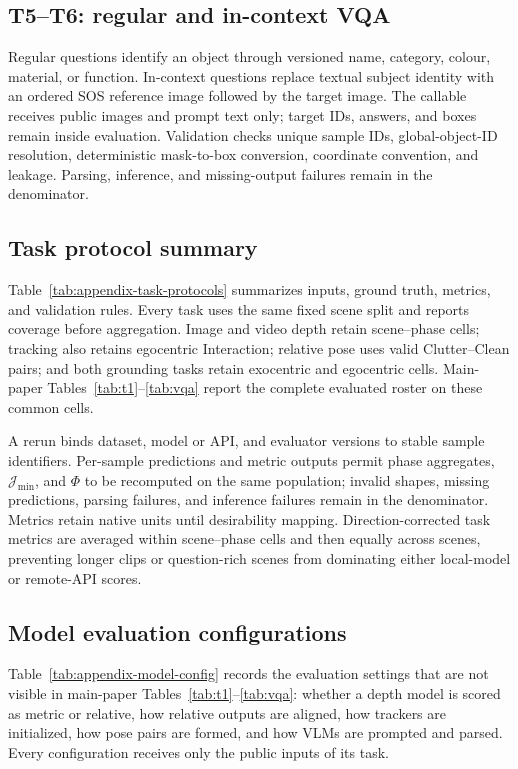 \subsection{T5--T6: regular and in-context VQA}

Regular questions identify an object through versioned name, category, colour, material, or function. In-context questions replace textual subject identity with an ordered SOS reference image followed by the target image. The callable receives public images and prompt text only; target IDs, answers, and boxes remain inside evaluation. Validation checks unique sample IDs, global-object-ID resolution, deterministic mask-to-box conversion, coordinate convention, and leakage. Parsing, inference, and missing-output failures remain in the denominator.

\subsection{Task protocol summary}

Table~\ref{tab:appendix-task-protocols} summarizes inputs, ground truth, metrics, and validation rules. Every task uses the same fixed scene split and reports coverage before aggregation. Image and video depth retain scene--phase cells; tracking also retains egocentric Interaction; relative pose uses valid Clutter--Clean pairs; and both grounding tasks retain exocentric and egocentric cells. Main-paper Tables~\ref{tab:t1}--\ref{tab:vqa} report the complete evaluated roster on these common cells.

A rerun binds dataset, model or API, and evaluator versions to stable sample identifiers. Per-sample predictions and metric outputs permit phase aggregates, $\mathcal J_{\min}$, and $\Phi$ to be recomputed on the same population; invalid shapes, missing predictions, parsing failures, and inference failures remain in the denominator. Metrics retain native units until desirability mapping. Direction-corrected task metrics are averaged within scene--phase cells and then equally across scenes, preventing longer clips or question-rich scenes from dominating either local-model or remote-API scores.

\subsection{Model evaluation configurations}
\label{sec:appendix-model-config}

Table~\ref{tab:appendix-model-config} records the evaluation settings that are not visible in main-paper Tables~\ref{tab:t1}--\ref{tab:vqa}: whether a depth model is scored as metric or relative, how relative outputs are aligned, how trackers are initialized, how pose pairs are formed, and how VLMs are prompted and parsed. Every configuration receives only the public inputs of its task.

